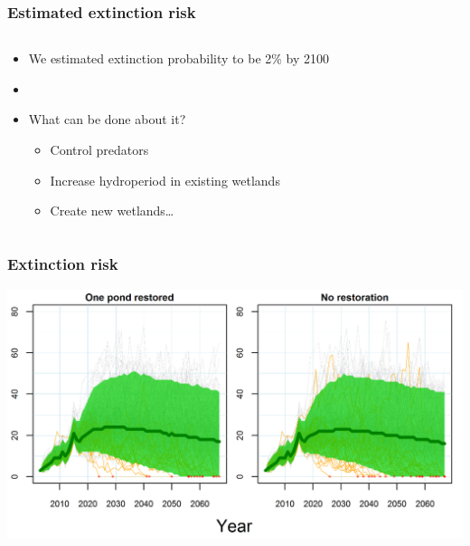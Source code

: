 \documentclass[color=usenames,dvipsnames]{beamer}\usepackage[]{graphicx}\usepackage[]{color}
\begin{document}
\begin{frame}
  \frametitle{Estimated extinction risk}
  \begin{columns}
    \begin{column}{0.6\textwidth}
      \begin{itemize}%
      \item<1-> We estimated extinction probability to be 2\% by 2100
      \item[]
      \item<2-> What can be done about it?
        \begin{itemize}
        \item<3-> Control predators
        \item<4-> Increase hydroperiod in existing wetlands
        \item<5-> Create new wetlands\dots
        \end{itemize}
      \end{itemize}
    \end{column}
    \begin{column}{0.4\textwidth}
      \begin{center}
      \end{center}
    \end{column}
  \end{columns}
\end{frame}



\begin{frame}
  \frametitle{Extinction risk}
  \begin{center}
    \includegraphics[width=\textwidth]{figs/lich-forecasts}
  \end{center}
\end{frame}
\end{document}
